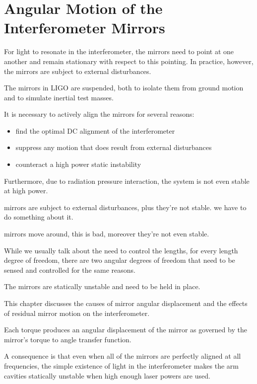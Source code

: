 \chapter{Angular Motion of the Interferometer Mirrors}

For light to resonate in the interferometer, the mirrors need to point at one another and remain stationary with respect to this pointing. In practice, however, the mirrors are subject to external disturbances. 

The mirrors in LIGO are suspended, both to isolate them from ground motion and to simulate inertial test masses. 


It is necessary to actively align the mirrors for several reasons:
\begin{itemize}
\item find the optimal DC alignment of the interferometer \vspace{-10 pt}
\item suppress any motion that does result from external disturbances \vspace{-10 pt}
\item counteract a high power static instability
\end{itemize}
Furthermore, due to radiation pressure interaction, the system is not even stable at high power.

mirrors are subject to external disturbances, plus they're not stable. we have to do something about it. 

mirrors move around, this is bad, moreover they're not even stable.

While we usually talk about the need to control the lengths, for every length degree of freedom, there are two angular degrees of freedom that need to be sensed and controlled for the same reasons. 

The mirrors are statically unstable and need to be held in place. 

This chapter discusses the causes of mirror angular displacement and the effects of residual mirror motion on the interferometer.




Each torque produces an angular displacement of the mirror as governed by the mirror's torque to angle transfer function.

A consequence is that even when all of the mirrors are perfectly aligned at all frequencies, the simple existence of light in the interferometer makes the arm cavities statically unstable when high enough laser powers are used.







